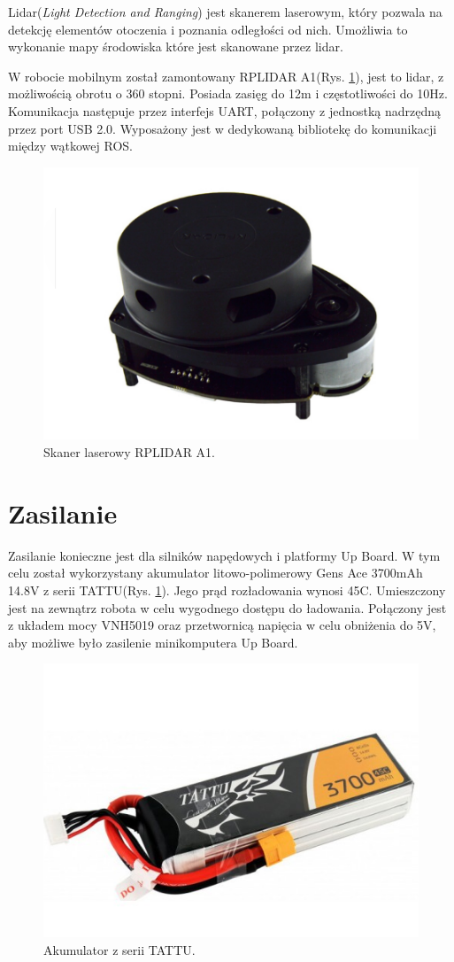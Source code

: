 Lidar(\textit{Light Detection and Ranging}) jest skanerem laserowym, który pozwala na detekcję elementów otoczenia i poznania odległości od nich. Umożliwia to wykonanie mapy środowiska które jest skanowane przez lidar.

W robocie mobilnym został zamontowany RPLIDAR A1(Rys. \ref{fig:lidar}), jest to  lidar, z możliwością obrotu o 360 stopni. Posiada zasięg do 12m i częstotliwości do 10Hz. Komunikacja następuje przez interfejs UART, połączony z jednostką nadrzędną przez port USB 2.0. Wyposażony jest w dedykowaną bibliotekę do komunikacji między wątkowej ROS.

\begin{figure}[h]
	\centering
	\includegraphics[scale=0.7]{lidar.png}
	\caption{Skaner laserowy RPLIDAR A1.}
	\label{fig:lidar}
\end{figure}



\section{Zasilanie}


Zasilanie konieczne jest dla silników napędowych i platformy Up Board. W tym celu został wykorzystany akumulator litowo-polimerowy Gens Ace 3700mAh 14.8V z serii TATTU(Rys. \ref{fig:lidar}). Jego prąd rozładowania wynosi 45C. Umieszczony jest na zewnątrz robota w celu wygodnego dostępu do ładowania. Połączony jest z układem mocy VNH5019 oraz przetwornicą napięcia w celu obniżenia do 5V, aby możliwe było zasilenie minikomputera Up Board.

\begin{figure}[h]
	\centering
	\includegraphics[scale=0.7]{bateria.png}
	\caption{Akumulator z serii TATTU.}
	\label{fig:bateria}
\end{figure}


